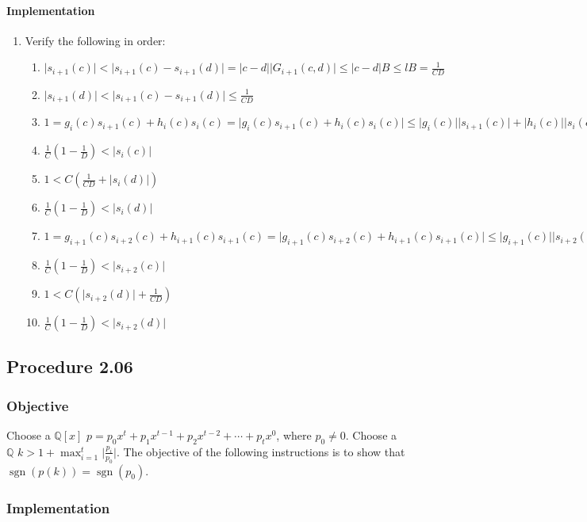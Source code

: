 \documentclass[twocolumn]{article}
\DeclareMathOperator{\sgn}{sgn}
\newcommand{\procedure}[2][]{\subsection*{Procedure #2 \ifthenelse{\equal{#1}{}}{}{(#1)}}\label{sec:procedure #2}}
\newcommand{\objective}{\subsubsection*{Objective}}
\newcommand{\implementation}{\subsubsection*{Implementation}}
\begin{document}
				\paragraph{Implementation}
					\begin{enumerate}
						\item Verify the following in order:
						\begin{enumerate}
							\item $\lvert s_{i+1}(c)\rvert<\lvert s_{i+1}(c)-s_{i+1}(d)\rvert=\lvert c-d\rvert\lvert G_{i+1}(c,d)\rvert\le\lvert c-d\rvert B\le lB=\frac{1}{CD}$
							\item $\lvert s_{i+1}(d)\rvert<\lvert s_{i+1}(c)-s_{i+1}(d)\rvert\le\frac{1}{CD}$
							\item $1=g_{i}(c)s_{i+1}(c)+h_{i}(c)s_{i}(c)=\lvert g_{i}(c)s_{i+1}(c)+h_{i}(c)s_{i}(c)\rvert\le\lvert g_{i}(c)\rvert\lvert s_{i+1}(c)\rvert+\lvert h_{i}(c)\rvert\lvert s_{i}(c)\rvert<C(\frac{1}{CD}+\lvert s_{i}(c)\rvert)$
							\item $\frac{1}{C}(1-\frac{1}{D})<\lvert s_{i}(c)\rvert$
							\item $1<C(\frac{1}{CD}+\lvert s_{i}(d)\rvert)$
							\item $\frac{1}{C}(1-\frac{1}{D})<\lvert s_{i}(d)\rvert$
							\item $1=g_{i+1}(c)s_{i+2}(c)+h_{i+1}(c)s_{i+1}(c)=\lvert g_{i+1}(c)s_{i+2}(c)+h_{i+1}(c)s_{i+1}(c)\rvert\le\lvert g_{i+1}(c)\rvert\lvert s_{i+2}(c)\rvert+\lvert h_{i+1}(c)\rvert\lvert s_{i+1}(c)\rvert<C(\lvert s_{i+2}(c)\rvert+\frac{1}{CD})$
							\item $\frac{1}{C}(1-\frac{1}{D})<\lvert s_{i+2}(c)\rvert$
							\item $1<C(\lvert s_{i+2}(d)\rvert+\frac{1}{CD})$
							\item $\frac{1}{C}(1-\frac{1}{D})<\lvert s_{i+2}(d)\rvert$
						\end{enumerate}
					\end{enumerate}
		\procedure{2.06}
			\objective
				Choose a $\mathbb{Q}[x]$ $p=p_0x^t+p_1x^{t-1}+p_2x^{t-2}+\cdots+p_tx^0$, where $p_0\ne 0$. Choose a $\mathbb{Q}$ $k>1+\max_{i=1}^t\lvert\frac{p_i}{p_0}\rvert$. The objective of the following instructions is to show that $\sgn(p(k))=\sgn(p_0)$.
			\implementation
\end{document}
